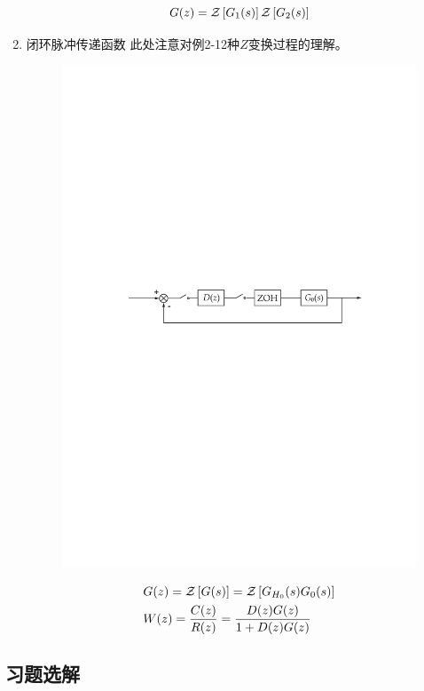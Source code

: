 \begin{enumerate}
\begin{multicols}{2}
        \begin{equation}
            G(z) = \mathcal{Z}\left[G_1(s)\right] \mathcal{Z}\left[G_2(s)\right]
        \end{equation}
    \end{multicols}
    \item 闭环脉冲传递函数
    此处注意对例2-12种$Z$变换过程的理解。
    \begin{figure}[H]
        \centering
        \includegraphics[scale=0.7]{figures/figure2.2.pdf}
    \end{figure}
    \begin{align}
        & G(z) = \mathcal{Z}\left[G(s)\right] = \mathcal{Z}\left[G_{H_0}(s) G_0(s)\right] \\
        & W(z) = \frac{C(z)}{R(z)} = \frac{D(z) G(z)}{1 + D(z)G(z)}
    \end{align}
\end{enumerate}

\subsection{习题选解}

